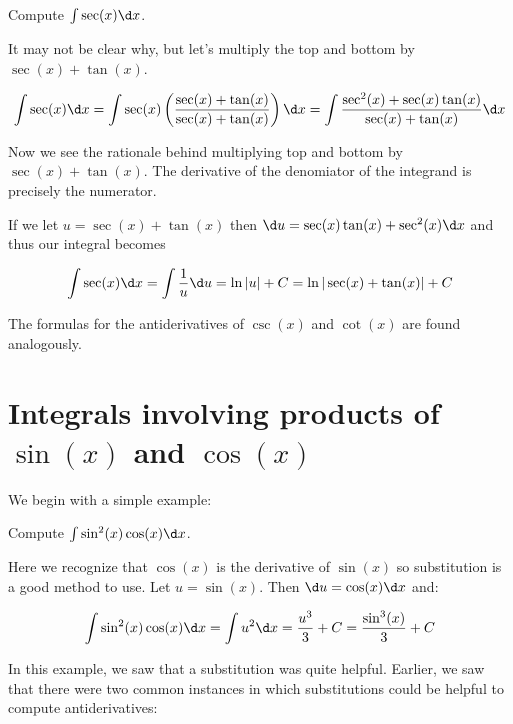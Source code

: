 \documentclass{ximera}
\begin{document}
\begin{example}
Compute $\int \sec(x) \d x$.

\begin{explanation}
It may not be clear why, but let's multiply the top and bottom by $\sec(x) + \tan(x)$. 

\[
\int \sec(x) \d x= \int \sec(x) \left( \frac{ \sec(x) + \tan(x)}{\sec(x)+\tan(x)} \right) \d x = \int \frac{ \sec^{2}(x) + \sec(x)\tan(x)}{\sec(x)+\tan(x)} \d x
\]

Now we see the rationale behind multiplying top and bottom by $\sec(x) + \tan(x)$. The derivative of the denomiator of the integrand is precisely the numerator. 

If we let $u=\sec(x)+\tan(x)$ then $\d u=\sec(x)\tan(x)+\sec^{2}(x) \d x$ and thus our integral becomes

\[
\int \sec(x) \d x = \int \frac{1}{u} \d u=\ln|u|+C=\ln|\sec(x)+\tan(x)|+C
\]

\end{explanation}

\end{example}


The formulas for the antiderivatives of $\csc(x)$ and $\cot(x)$ are found analogously.

\section{Integrals involving products of $\sin(x)$ and $\cos(x)$}

We begin with a simple example:

\begin{example}
Compute $\int \sin^{2}(x) \cos(x) \d x$.

\begin{explanation}
Here we recognize that $\cos(x)$ is the derivative of $\sin(x)$ so substitution is a good method to use. Let $u=\sin(x)$. Then $\d u=\cos(x) \d x$ and: 

\[ 
\int \sin^{2}(x) \cos(x) \d x = \int u^{2} \d x=\frac{u^{3}}{3}+C=\frac{ \sin^{3}(x)}{3}+C
\]
\end{explanation}

\end{example}

In this example, we saw that a substitution was quite helpful.  Earlier, we saw that there were two common instances in which substitutions could be helpful to compute antiderivatives:
\end{document}
